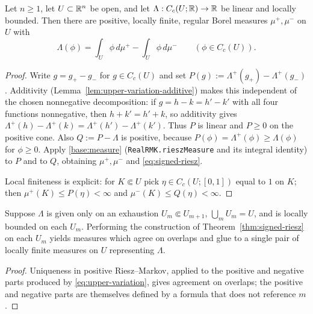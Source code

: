 \begin{theorem}\label{thm:signed-riesz}
Let $n\ge1$, let $U\subset\mathbb R^n$ be open, and let
$\Lambda:C_c(U;\mathbb R)\to\mathbb R$ be linear and locally
bounded.  Then there are positive, locally finite, regular Borel measures
$\mu^+,\mu^-$ on $U$ with
\begin{equation}\label{eq:signed-riesz}
  \Lambda(\phi)=\int_U\phi\,d\mu^+-\int_U\phi\,d\mu^-
  \qquad(\phi\in C_c(U)).
\end{equation}
\end{theorem}

\begin{proof}
Write $g=g_+-g_-$ for $g\in C_c(U)$ and set
$P(g):=\Lambda^+(g_+)-\Lambda^+(g_-)$.  Additivity
(Lemma~\ref{lem:upper-variation-additive}) makes this independent of the
chosen nonnegative decomposition: if $g=h-k=h'-k'$ with all four functions
nonnegative, then $h+k'=h'+k$, so additivity gives
$\Lambda^+(h)-\Lambda^+(k)=\Lambda^+(h')-\Lambda^+(k')$.  Thus $P$ is linear
and $P\ge0$ on the positive cone.  Also $Q:=P-\Lambda$ is positive, because
$P(\phi)=\Lambda^+(\phi)\ge\Lambda(\phi)$ for $\phi\ge0$.  Apply
\ref{base:measure} (\texttt{RealRMK.rieszMeasure} and its integral identity)
to $P$ and to $Q$, obtaining $\mu^+,\mu^-$ and \eqref{eq:signed-riesz}.

Local finiteness is explicit: for $K\Subset U$ pick
$\eta\in C_c(U;[0,1])$ equal to $1$ on $K$; then $\mu^+(K)\le P(\eta)<\infty$
and $\mu^-(K)\le Q(\eta)<\infty$.
\end{proof}

\begin{lemma}\label{lem:riesz-exhaustion}
Suppose $\Lambda$ is given only on an exhaustion
$U_m\Subset U_{m+1}$, $\bigcup_mU_m=U$, and is locally bounded on each
$U_m$.  Performing the construction of Theorem~\ref{thm:signed-riesz} on each
$U_m$ yields measures which agree on overlaps and glue to a single pair of
locally finite measures on $U$ representing $\Lambda$.
\end{lemma}

\begin{proof}
Uniqueness in positive Riesz--Markov, applied to the positive and negative
parts produced by \eqref{eq:upper-variation}, gives agreement on overlaps;
the positive and negative parts are themselves defined by a formula that does
not reference $m$.
\end{proof}

